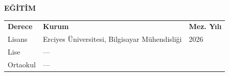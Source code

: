 \documentclass[12pt, a4paper]{report}
\begin{document}
\vspace{0.8cm}
\noindent\textbf{EĞİTİM}

\vspace{0.3cm}
\begin{tabular}{lll}
  \textbf{Derece} & \textbf{Kurum}                                 & \textbf{Mez. Yılı} \\[3pt]
  Lisans          & Erciyes Üniversitesi, Bilgisayar Mühendisliği  & 2026 \\[3pt]
  Lise            & ---                                            & \\
  Ortaokul        & ---                                            & \\
\end{tabular}
\end{document}

